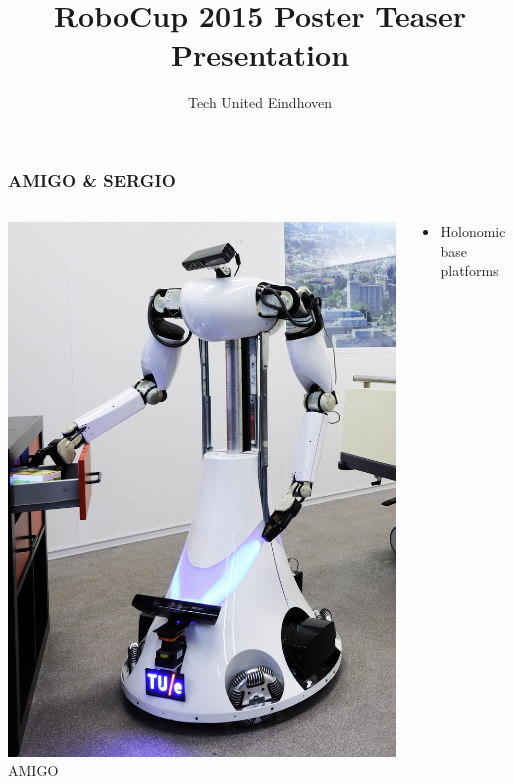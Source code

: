 \documentclass[t]{beamer}
\title{RoboCup 2015 Poster Teaser Presentation}
\author{Tech United Eindhoven}
\begin{document}
\begin{titleframe}
\end{titleframe}

\begin{frame}
    \frametitle{AMIGO \& SERGIO}
    \begin{columns}
	    \begin{column}{0.3\textwidth}
            \begin{center}
                \includegraphics[width = 1\linewidth]{Figures/amigo_hospital72}\\
				AMIGO
            \end{center}
        \end{column}
        \hfill
        \begin{column}{0.4\textwidth}
            \begin{itemize}
                \item Holonomic base platforms

\end{itemize}
\end{column}
\end{columns}
\end{frame}
\end{document}

